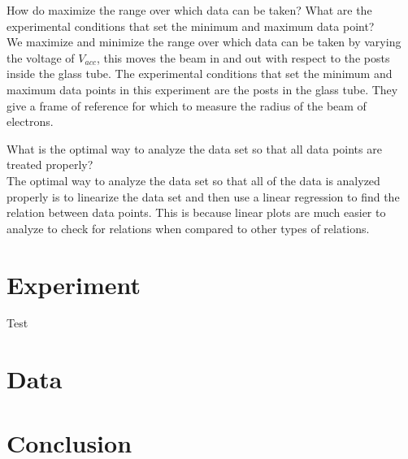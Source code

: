 \documentclass[aps,prl,10pt,twocolumn,floatfix]{revtex4-2}
\begin{document}
How do maximize the range over which data can be taken? What are the experimental conditions that
set the minimum and maximum data point?\\
We maximize and minimize the range over which data can be taken by varying the voltage of $V_{acc}$, this moves the beam in and out with respect to the posts inside the glass tube.
The experimental conditions that set the minimum and maximum data points in this experiment are the posts in the glass tube.
They give a frame of reference for which to measure the radius of the beam of electrons.

What is the optimal way to analyze the data set so that all data points are treated properly?\\
The optimal way to analyze the data set so that all of the data is analyzed properly is to linearize the data set and then use a linear regression to find the relation between data points.
This is because linear plots are much easier to analyze to check for relations when compared to other types of relations.

\section{Experiment}

Test

\section{Data}

\section{Conclusion}
\end{document}
